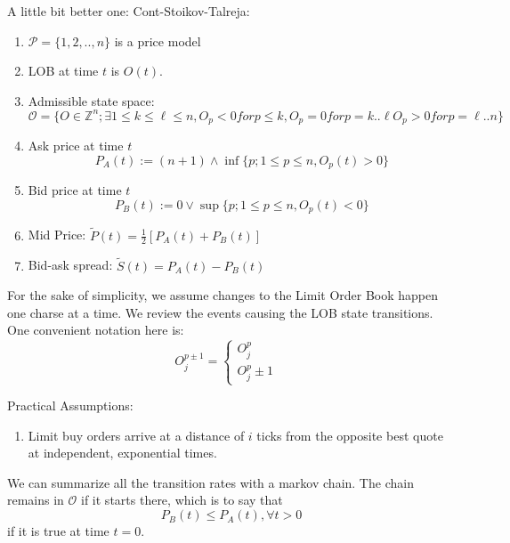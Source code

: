 \documentclass[twocolumn,openany]{book}
\begin{document}
A little bit better one: Cont-Stoikov-Talreja:
\begin{enumerate}
	\item $\mathcal{P}=\{1,2,..,n\}$ is a price model
	\item LOB at time $t$ is $O(t)$.
	\item Admissible state space:
	\begin{equation}
		\mathcal{O} = \{ O \in \mathbb{Z}^n; \exists 1\leq k \leq \ell \leq n, O_p<0 for p\leq k,
				O_p=0 for p=k..\ell
				O_p>0 for p=\ell..n 
				\}
	\end{equation}
	\item Ask price at time $t$
	\begin{equation}
		P_A(t):= (n+1)\wedge \inf \{ p; 1\leq p \leq n, O_p(t) > 0 \}
	\end{equation}
	\item Bid price at time $t$
	\begin{equation}
		P_B(t):= 0 \vee \sup \{ p; 1\leq p \leq n, O_p(t) < 0\}
	\end{equation}
	\item Mid Price: $\tilde{P}(t) = \frac12 [P_A(t) + P_B(t)]$
	\item Bid-ask spread: $\tilde{S}(t) = P_A(t) - P_B(t)$
	
\end{enumerate}

For the sake of simplicity, we assume changes to the Limit Order Book happen one charse at a time.
We review the events causing the LOB state transitions. One convenient notation here is:
\begin{equation}
	O^{p\pm 1}_j = \begin{cases}
		O_j^p   	& \\
		O_j^p \pm 1	& 
	\end{cases}
\end{equation}

Practical Assumptions:
\begin{enumerate}
	\item Limit buy orders arrive at a distance of $i$ ticks from the opposite best quote at independent, exponential times.
\end{enumerate}

We can summarize all the transition rates with a markov chain.
The chain remains in $\mathcal{O}$ if it starts there, which is to say that
\begin{equation}
	P_B(t) \leq P_A(t), \forall t > 0
\end{equation}
if it is true at time $t=0$.
\end{document}
